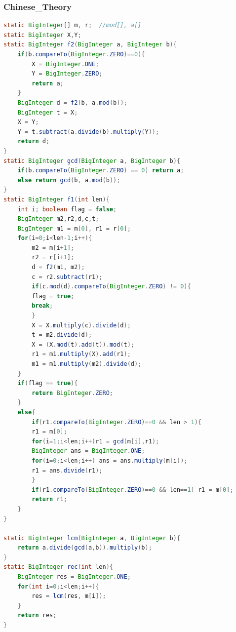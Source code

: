 \documentclass[a4paper]{article}
\begin{document}
\begin{CJK*}{UTF8}{gbsn}
\begin{multicols}{3}
\begin{flushleft}
\subsubsection{Chinese\_Theory}
\begin{lstlisting}[language={Java}]
static BigInteger[] m, r;  //mod[], a[]
static BigInteger X,Y;
static BigInteger f2(BigInteger a, BigInteger b){
	if(b.compareTo(BigInteger.ZERO)==0){
	    X = BigInteger.ONE;
	    Y = BigInteger.ZERO;
	    return a;
	}
	BigInteger d = f2(b, a.mod(b));
	BigInteger t = X;
	X = Y;
	Y = t.subtract(a.divide(b).multiply(Y));
	return d;
}
static BigInteger gcd(BigInteger a, BigInteger b){
	if(b.compareTo(BigInteger.ZERO) == 0) return a;
	else return gcd(b, a.mod(b));
}
static BigInteger f1(int len){
	int i; boolean flag = false;
	BigInteger m2,r2,d,c,t;
	BigInteger m1 = m[0], r1 = r[0];
	for(i=0;i<len-1;i++){
	    m2 = m[i+1];
	    r2 = r[i+1];
	    d = f2(m1, m2);
	    c = r2.subtract(r1);
	    if(c.mod(d).compareTo(BigInteger.ZERO) != 0){
		flag = true;
		break;
	    }
	    X = X.multiply(c).divide(d);
	    t = m2.divide(d);
	    X = (X.mod(t).add(t)).mod(t);
	    r1 = m1.multiply(X).add(r1);
	    m1 = m1.multiply(m2).divide(d);
	}
	if(flag == true){
	    return BigInteger.ZERO;
	}
	else{
	    if(r1.compareTo(BigInteger.ZERO)==0 && len > 1){
		r1 = m[0];
		for(i=1;i<len;i++)r1 = gcd(m[i],r1);
		BigInteger ans = BigInteger.ONE;
		for(i=0;i<len;i++) ans = ans.multiply(m[i]);
		r1 = ans.divide(r1);
	    }
	    if(r1.compareTo(BigInteger.ZERO)==0 && len==1) r1 = m[0];
	    return r1;
	}
}

static BigInteger lcm(BigInteger a, BigInteger b){
	return a.divide(gcd(a,b)).multiply(b);
}
static BigInteger rec(int len){
	BigInteger res = BigInteger.ONE;
	for(int i=0;i<len;i++){
	    res = lcm(res, m[i]);
	}
	return res;
}
\end{lstlisting}



\end{flushleft}
\end{multicols}
\end{CJK*}
\end{document}
